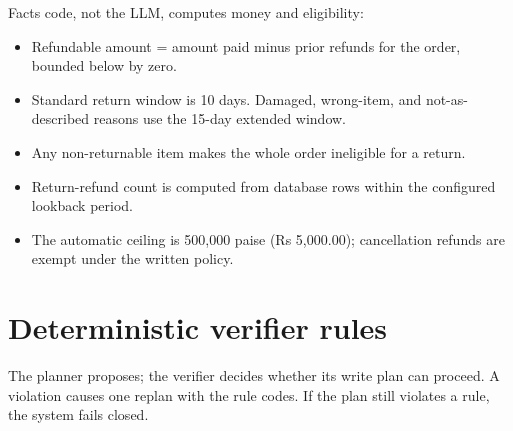 \documentclass[11pt,a4paper]{article}
\begin{document}
Facts code, not the LLM, computes money and eligibility:

\begin{itemize}
\item Refundable amount = amount paid minus prior refunds for the order, bounded below by zero.
\item Standard return window is 10 days. Damaged, wrong-item, and not-as-described reasons use the 15-day extended window.
\item Any non-returnable item makes the whole order ineligible for a return.
\item Return-refund count is computed from database rows within the configured lookback period.
\item The automatic ceiling is 500,000 paise (Rs 5,000.00); cancellation refunds are exempt under the written policy.
\end{itemize}

\section{Deterministic verifier rules}

The planner proposes; the verifier decides whether its write plan can proceed. A violation causes one replan with the rule codes. If the plan still violates a rule, the system fails closed.
\end{document}
